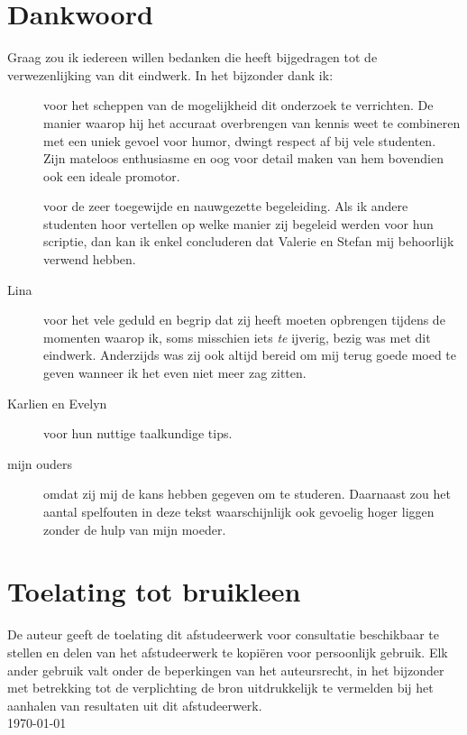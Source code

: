 \newpage
\thispagestyle{plain}

\section*{Dankwoord}
Graag zou ik iedereen willen bedanken die heeft bijgedragen tot de
verwezenlijking van dit eindwerk. In het bijzonder dank ik:
\begin{description}
\item[\promotor] voor het scheppen van de mogelijkheid dit 
onderzoek te verrichten. 
De manier waarop hij het accuraat overbrengen van kennis weet te combineren
met een uniek gevoel voor humor, dwingt respect af bij vele studenten. Zijn 
mateloos enthusiasme en oog voor detail maken van hem bovendien 
ook een ideale promotor.
\item[\begeleider] voor de zeer toegewijde en nauwgezette begeleiding. Als ik andere
studenten hoor vertellen op welke manier zij begeleid werden voor hun scriptie, dan kan 
ik enkel concluderen dat Valerie en Stefan mij behoorlijk verwend hebben.
\item[Lina] voor het vele geduld en begrip dat zij heeft moeten opbrengen tijdens de 
momenten waarop ik, soms misschien iets \emph{te} ijverig, bezig was met dit
eindwerk. Anderzijds was zij ook altijd bereid om mij terug goede moed te geven
wanneer ik het even niet meer zag zitten.
\item[Karlien en Evelyn] voor hun nuttige taalkundige tips.
\item[mijn ouders] omdat zij mij de kans hebben gegeven om te studeren. Daarnaast
zou het aantal spelfouten in deze tekst waarschijnlijk ook gevoelig hoger liggen
zonder de hulp van mijn moeder.
\end{description}
\vfill


\section*{Toelating tot bruikleen}
De auteur geeft de toelating dit afstudeerwerk voor consultatie 
beschikbaar te stellen en delen van het afstudeerwerk te kopi\"eren voor
persoonlijk gebruik. Elk ander gebruik valt onder de beperkingen van het 
auteursrecht, in het bijzonder met betrekking tot de verplichting de bron 
uitdrukkelijk te vermelden bij het aanhalen van resultaten uit dit 
afstudeerwerk.
\\[1cm]
\auteur\hfill \today
\\[1cm]